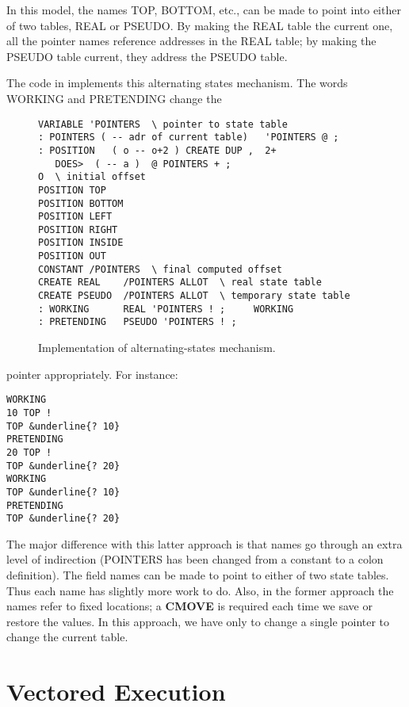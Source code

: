 

In this model, the names TOP, BOTTOM, etc., can be made to point
into either of two tables, REAL or PSEUDO. By making the REAL table
the current one, all the pointer names reference addresses in the REAL
table; by making the PSEUDO table current, they address the PSEUDO
table.

The code in  implements this alternating states
mechanism. The words WORKING and PRETENDING change the

\begin{figure*}
\caption{Implementation of alternating-states mechanism.}
\begin{center}
\begin{BVerbatim}
VARIABLE 'POINTERS  \ pointer to state table
: POINTERS ( -- adr of current table)   'POINTERS @ ;
: POSITION   ( o -- o+2 ) CREATE DUP ,  2+
   DOES>  ( -- a )  @ POINTERS + ;
O  \ initial offset
POSITION TOP
POSITION BOTTOM
POSITION LEFT
POSITION RIGHT
POSITION INSIDE
POSITION OUT
CONSTANT /POINTERS  \ final computed offset
CREATE REAL    /POINTERS ALLOT  \ real state table
CREATE PSEUDO  /POINTERS ALLOT  \ temporary state table
: WORKING      REAL 'POINTERS ! ;     WORKING
: PRETENDING   PSEUDO 'POINTERS ! ;
\end{BVerbatim}
\end{center}
\end{figure*}
pointer appropriately. For instance:

\begin{Verbatim}[commandchars=&\{\}]
WORKING
10 TOP !
TOP &underline{? 10}
PRETENDING
20 TOP !
TOP &underline{? 20}
WORKING
TOP &underline{? 10}
PRETENDING
TOP &underline{? 20}
\end{Verbatim}

The major difference with this latter approach is that names go through
an extra level of indirection (POINTERS has been changed from a
constant to a colon definition). The field names can be made to point to
either of two state tables. Thus each name has slightly more work to do.
Also, in the former approach the names refer to fixed locations; a
\textbf{CMOVE} is required each time we save or restore the values. In this
approach, we have only to change a single pointer to change the current
table.

\section{Vectored Execution}

